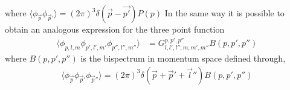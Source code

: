 \documentclass[a4paper,11pt]{article}
\numberwithin{equation}{section}
\numberwithin{equation}{section}
\begin{document}
where $\langle\phi_{\vec{p}}\phi_{\vec{p}'}\rangle=(2\pi)^3\delta(\vec{p}-\vec{p'})P(p)$
In the same way it is possible to obtain an analogous expression for the three point function
\begin{align}
\langle\phi_{p,l,m}\phi_{p',l',m'}\phi_{p'',l'',m''}\rangle&=G^{p,p',p''}_{l,l',l'';m,m',m''}B(p,p',p'')
\end{align}
where $B(p,p',p'')$ is the bispectrum in momentum space defined through,
\begin{align}
\langle\phi_{\vec{p}}\phi_{\vec{p}'}\phi_{\vec{p}''}\rangle=(2\pi)^3\delta(\vec{p}+\vec{p}'+\vec{l}'')B(p,p',p'')
\label{eq:relation_delta_G}
\end{align}




 
 
\end{document}
